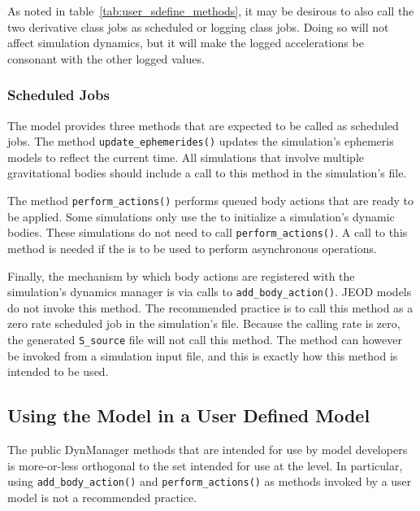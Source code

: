 As noted in table~\ref{tab:user_sdefine_methods}, it may be
desirous to also call the two derivative class jobs as scheduled or
logging class jobs. Doing so will not affect simulation dynamics, but it
will make the logged accelerations be consonant with the other logged values.

 
\subsubsection{Scheduled Jobs}\label{sec:user_integration_scheduled}
The model provides three methods that are expected to be called as
scheduled jobs. The method \verb+update_ephemerides()+ updates the
simulation's ephemeris models to reflect the current time. All simulations
that involve multiple gravitational bodies should include a call to
this method in the simulation's \Sdefine file.

The method \verb+perform_actions()+ performs queued body actions that
are ready to be applied. Some simulations only use the \BODYACTION
to initialize a simulation's dynamic bodies. These simulations do not
need to call \verb+perform_actions()+. A call to this method is needed
if the \BODYACTION is to be used to perform asynchronous operations.

Finally, the mechanism by which body actions are registered with the
simulation's dynamics manager is via calls to \verb+add_body_action()+.
JEOD models do not invoke this method. The recommended practice is to call this
method as a zero rate scheduled job in the simulation's \Sdefine file.
Because the calling rate is zero, the generated \verb+S_source+ file will not
call this method.
The method can however be invoked from a simulation input file,
and this is exactly how this method is intended to be used.

\subsection{Using the Model in a User Defined Model}
The public DynManager methods that are intended for use by model developers is
more-or-less orthogonal to the set intended for use at the \Sdefine level.
In particular, using \verb+add_body_action()+ and \verb+perform_actions()+ as
methods invoked by a user model is not a recommended practice.

